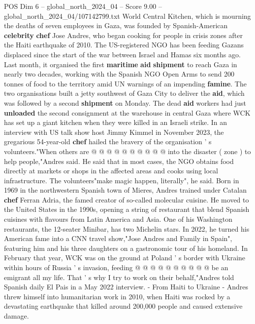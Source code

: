 \begin{textsample}{POS Dim 6 – global\_north\_2024\_04 – Score 9.00 – global\_north\_2024\_04/107142799.txt}  \label{ex:f6_pos_076}
World Central Kitchen, which is mourning the deaths of seven employees in Gaza, was founded by Spanish-American \textbf{celebrity} \textbf{chef} Jose Andres, who began cooking for people in crisis zones after the Haiti earthquake of 2010.
The US-registered NGO has been feeding Gazans displaced since the start of the war between Israel and Hamas six months ago.
Last month, it organised the first \textbf{maritime} \textbf{aid} \textbf{shipment} to reach Gaza in nearly two decades, working with the Spanish NGO Open Arms to send 200 tonnes of food to the territory amid UN warnings of an impending \textbf{famine}.
The two organisations built a jetty southwest of Gaza City to deliver the \textbf{aid}, which was followed by a second \textbf{shipment} on Monday.
The dead \textbf{aid} workers had just \textbf{unloaded} the second consignment at the warehouse in central Gaza where WCK has set up a giant kitchen when they were killed in an Israeli strike.
In an interview with US talk show host Jimmy Kimmel in November 2023, the gregarious 54-year-old \textbf{chef} hailed the bravery of the organisation ' s volunteers."When others are @ @ @ @ @ @ @ @ @ @ into the disaster ( zone ) to help people,"Andres said.
He said that in most cases, the NGO obtains food directly at markets or shops in the affected areas and cooks using local infrastructure.
The volunteers"make magic happen, literally", he said.
Born in 1969 in the northwestern Spanish town of Mieres, Andres trained under Catalan \textbf{chef} Ferran Adria, the famed creator of so-called molecular cuisine.
He moved to the United States in the 1990s, opening a string of restaurant that blend Spanish cuisines with flavours from Latin America and Asia.
One of his Washington restaurants, the 12-seater Minibar, has two Michelin stars.
In 2022, he turned his American fame into a CNN travel show,"Jose Andres and Family in Spain", featuring him and his three daughters on a gastronomic tour of his homeland.
In February that year, WCK was on the ground at Poland ' s border with Ukraine within hours of Russia ' s invasion, feeding @ @ @ @ @ @ @ @ @ @ be an emigrant all my life.
That ' s why I try to work on their behalf,"Andres told Spanish daily El Pais in a May 2022 interview. - From Haiti to Ukraine - Andres threw himself into humanitarian work in 2010, when Haiti was rocked by a devastating earthquake that killed around 200,000 people and caused extensive damage.

\end{textsample}
